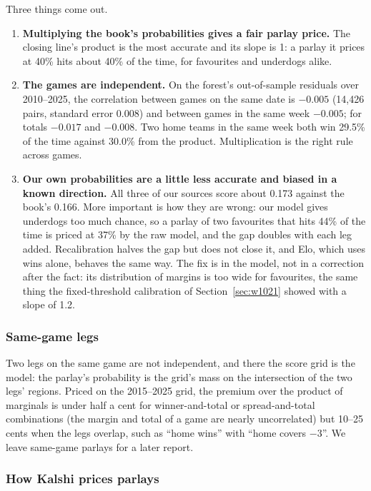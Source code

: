 Three things come out.
\begin{enumerate}[nosep]
\item \textbf{Multiplying the book's probabilities gives a fair parlay price.} The closing line's product is the most accurate and its slope is 1: a parlay it prices at 40\% hits about 40\% of the time, for favourites and underdogs alike.
\item \textbf{The games are independent.} On the forest's out-of-sample residuals over 2010--2025, the correlation between games on the same date is $-0.005$ (14,426 pairs, standard error 0.008) and between games in the same week $-0.005$; for totals $-0.017$ and $-0.008$. Two home teams in the same week both win 29.5\% of the time against 30.0\% from the product. Multiplication is the right rule across games.
\item \textbf{Our own probabilities are a little less accurate and biased in a known direction.} All three of our sources score about 0.173 against the book's 0.166. More important is how they are wrong: our model gives underdogs too much chance, so a parlay of two favourites that hits 44\% of the time is priced at 37\% by the raw model, and the gap doubles with each leg added. Recalibration halves the gap but does not close it, and Elo, which uses wins alone, behaves the same way. The fix is in the model, not in a correction after the fact: its distribution of margins is too wide for favourites, the same thing the fixed-threshold calibration of Section~\ref{sec:w1021} showed with a slope of 1.2.
\end{enumerate}

\subsubsection{Same-game legs}

Two legs on the same game are not independent, and there the score grid is the model: the parlay's probability is the grid's mass on the intersection of the two legs' regions. Priced on the 2015--2025 grid, the premium over the product of marginals is under half a cent for winner-and-total or spread-and-total combinations (the margin and total of a game are nearly uncorrelated) but 10--25 cents when the legs overlap, such as ``home wins'' with ``home covers $-3$''. We leave same-game parlays for a later report.

\subsubsection{How Kalshi prices parlays}

